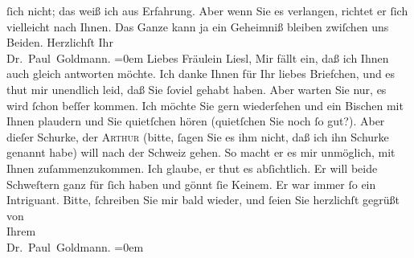 \begin{ledgroupsized}[t]{13cm}
               ſich nicht; das weiß ich aus Erfahrung. Aber wenn Sie es verlangen, richtet er ſich
               vielleicht nach Ihnen. Das Ganze kann ja ein Geheimniß bleiben zwiſchen uns  Beiden.\pend
           \pstart
           Herzlichſt Ihr {\\[\baselineskip]}\spacefill\mbox{Dr. Paul Goldmann.}\pend
           \leftskip=0em{}{\bigskip}\pstart
           \noindent{}{\pb}Liebes Fräulein Liesl,\pend
           \pstart
           Mir fällt ein, daß ich Ihnen auch gleich antworten möchte. Ich danke Ihnen für Ihr
               liebes Briefchen, und es thut mir unendlich leid, daß Sie ſoviel \label{K_L03071-12v}\label{K_L03071-12h} gehabt
               haben. Aber warten Sie nur, es wird ſchon beſſer kommen. Ich möchte Sie gern
               wiederſehen und ein Bischen mit Ihnen plaudern und Sie quietſchen hören (quietſchen
               Sie noch ſo gut?). Aber dieſer {\pb}Schurke, der \textsc{Arthur} (bitte,  ſagen Sie es ihm \strikeout{\textcolor{gray}{×}\-\textcolor{gray}{×}\-\textcolor{gray}{×}} nicht, daß ich ihn Schurke genannt habe) will nach der Schweiz gehen. So macht er es mir unmöglich, mit Ihnen
               zuſammenzukommen. Ich glaube, er thut es abſichtlich. Er will beide Schweſtern ganz
               für ſich haben und gönnt ſie Keinem. Er war immer ſo ein Intriguant.\pend
           \pstart
           {\pb}Bitte, ſchreiben Sie mir bald wieder, und ſeien Sie
               herzlichſt gegrüßt von {\\[\baselineskip]}Ihrem {\\[\baselineskip]}\spacefill\mbox{Dr. Paul Goldmann.}\pend
           \leftskip=0em{}
         
         \endnumbering{}\end{ledgroupsized}  \newcommand{\dateiname}{L03071}\newcommand{\titel}{Paul Goldmann an Arthur Schnitzler, Olga und Elisabeth Gussmann, 3. 7. [1901]}\newcommand{\editorInnen}{Martin Anton Müller und Laura Untner}
      